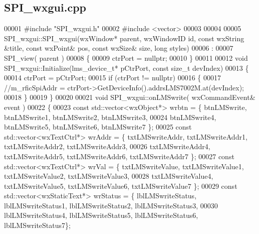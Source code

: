 \subsection{S\+P\+I\+\_\+wxgui.\+cpp}
\label{SPI__wxgui_8cpp_source}

\begin{DoxyCode}
00001 \textcolor{preprocessor}{#include "SPI_wxgui.h"}
00002 \textcolor{preprocessor}{#include <vector>}
00003 
00004 
00005 SPI_wxgui::SPI_wxgui(wxWindow* parent, wxWindowID \textcolor{keywordtype}{id}, \textcolor{keyword}{const} wxString &title, \textcolor{keyword}{const} wxPoint& pos, \textcolor{keyword}{const} 
      wxSize& size, \textcolor{keywordtype}{long} styles)
00006 :
00007 SPI_view( parent )
00008 \{
00009     ctrPort = \textcolor{keyword}{nullptr};
00010 \}
00011 
00012 \textcolor{keywordtype}{void} SPI_wxgui::Initialize(lms_device_t* pCtrPort, \textcolor{keyword}{const} \textcolor{keywordtype}{size\_t} devIndex)
00013 \{
00014     ctrPort = pCtrPort;
00015     \textcolor{keywordflow}{if} (ctrPort != \textcolor{keyword}{nullptr})
00016     \{
00017         \textcolor{comment}{//m\_rficSpiAddr = ctrPort->GetDeviceInfo().addrsLMS7002M.at(devIndex);}
00018     \}
00019 \}
00020 
00021 \textcolor{keywordtype}{void} SPI_wxgui::onLMSwrite( wxCommandEvent& event )
00022 \{
00023     \textcolor{keyword}{const} std::vector<wxObject*> wrbtn = \{ btnLMSwrite, btnLMSwrite1, 
      btnLMSwrite2, btnLMSwrite3,
00024                                             btnLMSwrite4, btnLMSwrite5, 
      btnLMSwrite6, btnLMSwrite7 \};
00025     \textcolor{keyword}{const} std::vector<wxTextCtrl*> wrAddr = \{ txtLMSwriteAddr, txtLMSwriteAddr1, 
      txtLMSwriteAddr2, txtLMSwriteAddr3,
00026                                                 txtLMSwriteAddr4, 
      txtLMSwriteAddr5, txtLMSwriteAddr6, txtLMSwriteAddr7 \};
00027     \textcolor{keyword}{const} std::vector<wxTextCtrl*> wrVal = \{ txtLMSwriteValue, txtLMSwriteValue1, 
      txtLMSwriteValue2, txtLMSwriteValue3,
00028                                              txtLMSwriteValue4, 
      txtLMSwriteValue5, txtLMSwriteValue6, txtLMSwriteValue7 \};
00029     \textcolor{keyword}{const} std::vector<wxStaticText*> wrStatus = \{ lblLMSwriteStatus, 
      lblLMSwriteStatus1, lblLMSwriteStatus2, lblLMSwriteStatus3,
00030                                                 lblLMSwriteStatus4, 
      lblLMSwriteStatus5, lblLMSwriteStatus6, lblLMSwriteStatus7\};

\end{DoxyCode}
